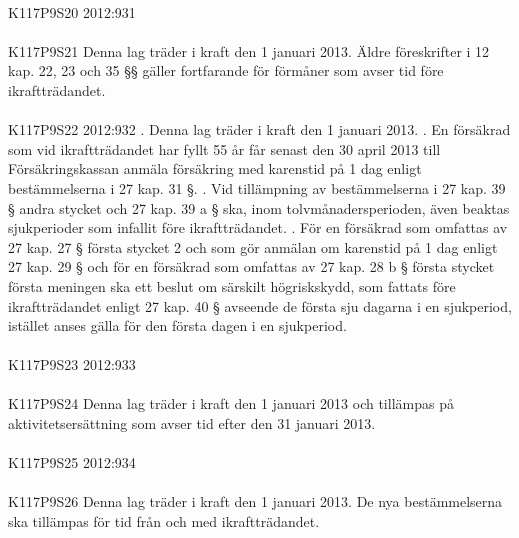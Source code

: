 \documentclass[a4paper,notitlepage,openany,10pt]{book}
\begin{document}
\paragraph*{}
{\tiny K117P9S20}
2012:931
\paragraph*{}
{\tiny K117P9S21}
Denna lag träder i kraft den 1 januari 2013. Äldre föreskrifter i 12 kap. 22, 23 och 35 §§ gäller fortfarande för förmåner som avser tid före ikraftträdandet.
\paragraph*{}
{\tiny K117P9S22}
2012:932
. Denna lag träder i kraft den 1 januari 2013.
. En försäkrad som vid ikraftträdandet har fyllt 55 år får senast den 30 april 2013 till Försäkringskassan anmäla försäkring med karenstid på 1 dag enligt bestämmelserna i 27 kap. 31 §.
. Vid tillämpning av bestämmelserna i 27 kap. 39 § andra stycket och 27 kap. 39 a § ska, inom tolvmånadersperioden, även beaktas sjukperioder som infallit före ikraftträdandet.
. För en försäkrad som omfattas av 27 kap. 27 § första stycket 2 och som gör anmälan om karenstid på 1 dag enligt 27 kap. 29 § och för en försäkrad som omfattas av 27 kap. 28 b § första stycket första meningen ska ett beslut om särskilt högriskskydd, som fattats före ikraftträdandet enligt 27 kap. 40 § avseende de första sju dagarna i en sjukperiod, istället anses gälla för den första dagen i en sjukperiod.
\paragraph*{}
{\tiny K117P9S23}
2012:933
\paragraph*{}
{\tiny K117P9S24}
Denna lag träder i kraft den 1 januari 2013 och tillämpas på aktivitetsersättning som avser tid efter den 31 januari 2013.
\paragraph*{}
{\tiny K117P9S25}
2012:934
\paragraph*{}
{\tiny K117P9S26}
Denna lag träder i kraft den 1 januari 2013. De nya bestämmelserna ska tillämpas för tid från och med ikraftträdandet.
\end{document}
